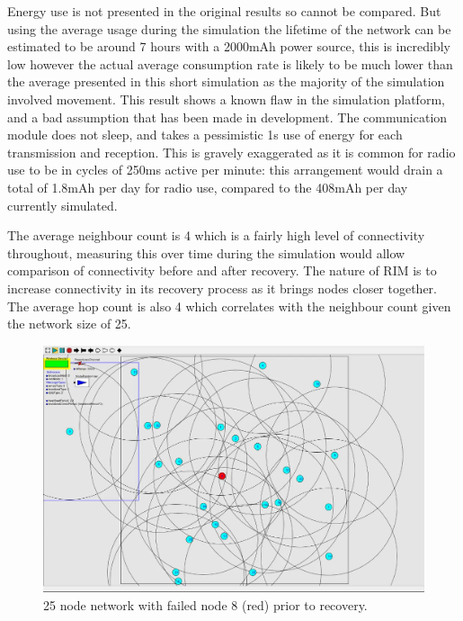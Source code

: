 \documentclass[authoryearcitations]{UoYCSproject}
\begin{document}
Energy use is not presented in the original results so cannot be compared. But using the average usage during the simulation the lifetime of the network can be estimated to be around 7 hours with a 2000mAh power source, this is incredibly low however the actual average consumption rate is likely to be much lower than the average presented in this short simulation as the majority of the simulation involved movement. This result shows a known flaw in the simulation platform, and a bad assumption that has been made in development. The communication module does not sleep, and takes a pessimistic 1s use of energy for each transmission and reception. This is gravely exaggerated as it is common for radio use to be in cycles of 250ms active per minute: this arrangement would drain a total of 1.8mAh per day for radio use, compared to the 408mAh per day currently simulated.

The average neighbour count is 4 which is a fairly high level of connectivity throughout, measuring this over time during the simulation would allow comparison of connectivity before and after recovery. The nature of RIM is to increase connectivity in its recovery process as it brings nodes closer together. The average hop count is also 4 which correlates with the neighbour count given the network size of 25.

\begin{figure}
 \centering
    \includegraphics[width=\textwidth]{figures/singlenodePrior.png}
    \caption{25 node network with failed node 8 (red) prior to recovery.}
    \label{fig:singlenodePrior}
\end{figure}
\end{document}
